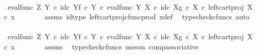 \begin{isabellebody}
\ \ \ \ \isamarkupfalse%
\ \isamarkupfalse%
\ {\isachardoublequoteopen}{\isachardot}{\kern0pt}{\isachardot}{\kern0pt}{\isachardot}{\kern0pt}\ {\isacharequal}{\kern0pt}\ {\isacharparenleft}{\kern0pt}{\isacharparenleft}{\kern0pt}eval{\isacharunderscore}{\kern0pt}func\ Z\ Y\ {\isasymcirc}\isactrlsub c\ {\isasymlangle}id\isactrlsub c\ Y{\isacharcomma}{\kern0pt}f\ {\isasymcirc}\isactrlsub c\ {\isasymbeta}\isactrlbsub Y\isactrlesub {\isasymrangle}{\isacharparenright}{\kern0pt}\ {\isasymcirc}\isactrlsub c\ eval{\isacharunderscore}{\kern0pt}func\ Y\ X\ {\isasymcirc}\isactrlsub c\ {\isasymlangle}id\isactrlsub c\ X{\isacharcomma}{\kern0pt}g\ {\isasymcirc}\isactrlsub c\ {\isasymbeta}\isactrlbsub X\isactrlesub {\isasymrangle}{\isacharparenright}{\kern0pt}\ {\isasymcirc}\isactrlsub c\ left{\isacharunderscore}{\kern0pt}cart{\isacharunderscore}{\kern0pt}proj\ X\ {\isasymone}\ {\isasymcirc}\isactrlsub c\ x{}{\isachardoublequoteclose}\isanewline
\ \ \ \ \ \ \isamarkupfalse%
\ assms\ id{\isacharunderscore}{\kern0pt}type\ left{\isacharunderscore}{\kern0pt}cart{\isacharunderscore}{\kern0pt}proj{\isacharunderscore}{\kern0pt}cfunc{\isacharunderscore}{\kern0pt}prod\ x{\isacharunderscore}{\kern0pt}def\ \isamarkupfalse%
\ {\isacharparenleft}{\kern0pt}typecheck{\isacharunderscore}{\kern0pt}cfuncs{\isacharcomma}{\kern0pt}\ auto{\isacharparenright}{\kern0pt}\isanewline
\ \ \ \ \isamarkupfalse%
\ \isamarkupfalse%
\ {\isachardoublequoteopen}{\isachardot}{\kern0pt}{\isachardot}{\kern0pt}{\isachardot}{\kern0pt}\ {\isacharequal}{\kern0pt}\ {\isacharparenleft}{\kern0pt}{\isacharparenleft}{\kern0pt}{\isacharparenleft}{\kern0pt}eval{\isacharunderscore}{\kern0pt}func\ Z\ Y\ {\isasymcirc}\isactrlsub c\ {\isasymlangle}id\isactrlsub c\ Y{\isacharcomma}{\kern0pt}f\ {\isasymcirc}\isactrlsub c\ {\isasymbeta}\isactrlbsub Y\isactrlesub {\isasymrangle}{\isacharparenright}{\kern0pt}\ {\isasymcirc}\isactrlsub c\ eval{\isacharunderscore}{\kern0pt}func\ Y\ X\ {\isasymcirc}\isactrlsub c\ {\isasymlangle}id\isactrlsub c\ X{\isacharcomma}{\kern0pt}g\ {\isasymcirc}\isactrlsub c\ {\isasymbeta}\isactrlbsub X\isactrlesub {\isasymrangle}{\isacharparenright}{\kern0pt}\ {\isasymcirc}\isactrlsub c\ left{\isacharunderscore}{\kern0pt}cart{\isacharunderscore}{\kern0pt}proj\ X\ {\isasymone}{\isacharparenright}{\kern0pt}\ {\isasymcirc}\isactrlsub c\ x{}{\isachardoublequoteclose}\isanewline
\ \ \ \ \ \ \isamarkupfalse%
\ assms\ \isamarkupfalse%
\ {\isacharparenleft}{\kern0pt}typecheck{\isacharunderscore}{\kern0pt}cfuncs{\isacharcomma}{\kern0pt}\ meson\ comp{\isacharunderscore}{\kern0pt}associative{}{\isacharparenright}{\kern0pt}\isanewline

\end{isabellebody}
